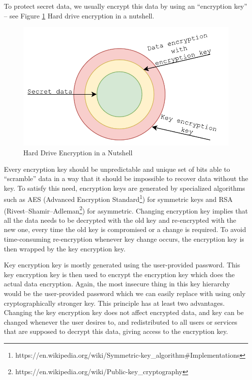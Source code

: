 To protect secret data, we usually encrypt this data by using an “encryption key” -- see Figure \ref{fig_encdata} Hard drive encryption in a nutshell.
\begin{figure}[h]
    \centering
    \includegraphics[scale=0.7]{figures/HowWeEncryptData.pdf}
    \caption{Hard Drive Encryption in a Nutshell}
    \label{fig_encdata}
\end{figure}
Every encryption key should be unpredictable and unique set of bits able to “scramble” data in a way that it should be impossible to recover data without the key.
To satisfy this need, encryption keys are generated by specialized algorithms such as AES (Advanced Encryption Standard\footnote{https://en.wikipedia.org/wiki/Symmetric-key\_algorithm\#Implementations}) for symmetric keys and RSA (Rivest–Shamir–Adleman\footnote{https://en.wikipedia.org/wiki/Public-key\_cryptography}) for asymmetric.
Changing encryption key implies that all the data needs to be decrypted with the old key and re-encrypted with the new one, every time the old key is compromised or a change is required.
To avoid time-consuming re-encryption whenever key change occurs, the encryption key is then wrapped by the key encryption key.

Key encryption key is mostly generated using the user-provided password.
This key encryption key is then used to encrypt the encryption key which does the actual data encryption.
Again, the most insecure thing in this key hierarchy would be the user-provided password which we can easily replace with using only cryptographically stronger key.
This principle has at least two advantages.
Changing the key encryption key does not affect encrypted data, and key can be changed whenever the user desires to, and redistributed to all users or services that are supposed to decrypt this data, giving access to the encryption key.

